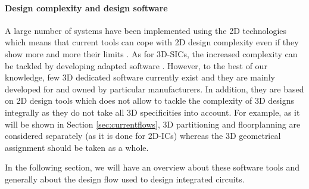 \paragraph{Design complexity and design software}
A large number of systems have been implemented using the 2D technologies which means that current tools can cope with 2D design complexity even if they show more and more their limits \cite{vanderbiest06, PFF10}. As for 3D-SICs, the increased complexity can be tackled by developing adapted software \cite{659500}. However, to the best of our knowledge, few 3D dedicated software currently exist and they are mainly developed for and owned by particular manufacturers. In addition, they are based on 2D design tools which does not allow to tackle the complexity of 3D designs integrally as they do not take all 3D specificities into account. For example, as it will be shown in Section \ref{sec:currentflows}, 3D partitioning and floorplanning are considered separately (as it is done for 2D-ICs) whereas the 3D geometrical assignment should be taken as a whole.

In the following section, we will have an overview about these software tools and generally about the design flow used to design integrated circuits.

%
%
%

